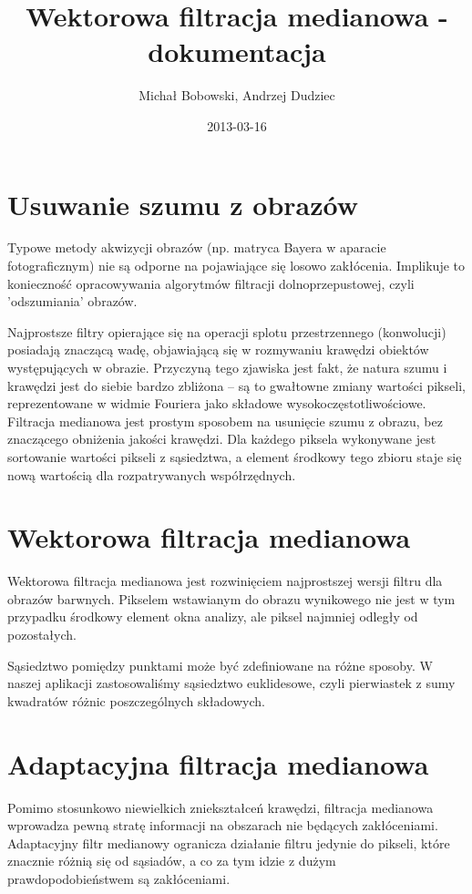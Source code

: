 \documentclass[a4paper,12pt,oneside,notitlepage,onecolumn]{article}
\author{Michał Bobowski, Andrzej Dudziec}
\date{2013-03-16}
\title{Wektorowa filtracja medianowa - dokumentacja}
\begin{document}
  \maketitle
\section{Usuwanie szumu z obrazów}
Typowe metody akwizycji obrazów (np. matryca Bayera w aparacie fotograficznym) nie są odporne na pojawiające się losowo zakłócenia.
Implikuje to konieczność opracowywania algorytmów filtracji dolnoprzepustowej, czyli 'odszumiania' obrazów.

Najprostsze filtry opierające się na operacji splotu przestrzennego (konwolucji) posiadają znaczącą wadę, objawiającą się w rozmywaniu krawędzi obiektów występujących w obrazie.
Przyczyną tego zjawiska jest fakt, że natura szumu i krawędzi jest do siebie bardzo zbliżona – są to gwałtowne zmiany wartości pikseli, reprezentowane w widmie Fouriera jako składowe wysokoczęstotliwościowe.
Filtracja medianowa jest prostym sposobem na usunięcie szumu z obrazu, bez znaczącego obniżenia jakości krawędzi.
Dla każdego piksela wykonywane jest sortowanie wartości pikseli z sąsiedztwa, a element środkowy tego zbioru staje się nową wartością dla rozpatrywanych współrzędnych.

\section{Wektorowa filtracja medianowa}
Wektorowa filtracja medianowa jest rozwinięciem najprostszej wersji filtru dla obrazów barwnych.
Pikselem wstawianym do obrazu wynikowego nie jest w tym przypadku środkowy element okna analizy, ale piksel najmniej odległy od pozostałych.

Sąsiedztwo pomiędzy punktami może być zdefiniowane na różne sposoby. 
W naszej aplikacji zastosowaliśmy sąsiedztwo euklidesowe, czyli pierwiastek z sumy kwadratów różnic poszczególnych składowych.

\section{Adaptacyjna filtracja medianowa}
Pomimo stosunkowo niewielkich zniekształceń krawędzi, filtracja medianowa wprowadza pewną stratę informacji na obszarach nie będących zakłóceniami.
Adaptacyjny filtr medianowy ogranicza działanie filtru jedynie do pikseli, które znacznie różnią się od sąsiadów, a co za tym idzie z dużym prawdopodobieństwem są zakłóceniami.
\end{document}
